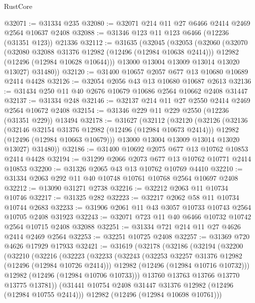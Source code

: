 \begin{lexlean}{RustCore}
\begin{coremodule}
@32071 := @31334 @235
@32080 := @32071 @214 @11 @27 @6466 @2414 @2469 @2564 @10637 @2408
@32088 := @31346 @123 @11 @123 @6466 (@12236 (@31351 @123)) @21336
@32112 := @31635
    (@32045
      (@32053
        (@32060
          (@32070
            (@32080 @32088 @31376 @12982 (@12496 (@12984 @10638 @2414)))
            @12982
            (@12496 (@12984 @10628 @10644)))
          @13000
          @13004
          @13009
          @13014
          @13020
          @13027)
        @31480))
@32120 := @31400 @10657 @2057 @677 @13 @10680 @10689 @2414 @4428
@32126 := @32054 @2056 @43 @13 @10680 @10687 @2613
@32136 := @31434 @250 @11 @40 @2676 @10679 @10686 @2564 @10662 @2408 @31447
@32137 := @31334 @248
@32146 := @32137 @214 @11 @27 @2550 @2414 @2469 @2564 @10672 @2408
@32154 := @31346 @229 @11 @229 @2550 (@12236 (@31351 @229)) @13494
@32178 := @31627
    (@32112
      (@32120
        (@32126
          (@32136
            (@32146 @32154 @31376 @12982 (@12496 (@12984 @10673 @2414)))
            @12982
            (@12496 (@12984 @10663 @10679)))
          @13000
          @13004
          @13009
          @13014
          @13020
          @13027)
        @31480))
@32186 := @31400 @10692 @2075 @677 @13 @10762 @10853 @2414 @4428
@32194 := @31299 @2066 @2073 @677 @13 @10762 @10771 @2414 @10853
@32200 := @31326 @2065 @43 @13 @10762 @10769 @4410
@32210 := @31334 @2063 @292 @11 @40 @10748 @10761 @10768 @2564 @10697 @2408
@32212 := @13090 @31271 @2738
@32216 := @32212 @2063 @11 @10734 @10746
@32217 := @31325 @282
@32223 := @32217 @2062 @58 @11 @10734 @10744 @2683
@32233 := @31906 @2061 @11 @43 @3057 @10733 @10743 @2564 @10705 @2408 @31923
@32243 := @32071 @723 @11 @40 @6466 @10732 @10742 @2564 @10715 @2408 @32088
@32251 := @31334 @721 @214 @11 @27 @4626 @2414 @2469 @2564
@32253 := @32251 @10725 @2408
@32257 := @31369 @720 @4626 @17929 @17933
@32421 := @31619
    (@32178
      (@32186
        (@32194
          (@32200
            (@32210
              (@32216
                (@32223
                  (@32233
                    (@32243
                      (@32253 @32257 @31376 @12982 (@12496 (@12984 @10726 @2414)))
                      @12982
                      (@12496 (@12984 @10716 @10732)))
                    @12982
                    (@12496 (@12984 @10706 @10733)))
                  @13760
                  @13763
                  @13766
                  @13770
                  @13775
                  @13781))
              (@31441 @10754 @2408 @31447 @31376 @12982 (@12496 (@12984 @10755 @2414)))
              @12982
              (@12496 (@12984 @10698 @10761)))

\end{coremodule}
\end{lexlean}
